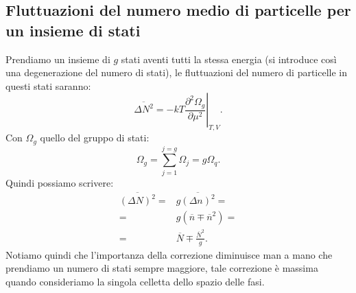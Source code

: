 \subsection{Fluttuazioni del numero medio di particelle per un insieme di stati}
\label{subsec:Fluttuazioni del numero medio di particelle per un insieme di stati}
Prendiamo un insieme di $g$ stati aventi tutti la stessa energia (si introduce così una degenerazione del numero di stati), le fluttuazioni del numero di particelle in questi stati saranno:
\[
	\overline{\Delta N^2} 
	=
	-kT \left.\frac{\partial ^2 \Omega_g}{\partial \mu^2} \right|_{T,V}
.\] 
Con $\Omega_g$ quello del gruppo di stati:
\[
	\Omega _g = \sum_{j=1}^{j=g} \Omega_j = g \Omega _q 
.\] 
Quindi possiamo scrivere:
\[\begin{aligned}
	\overline{\left( \Delta N \right) ^2} 
	=&
	g \overline{\left( \Delta n \right)^2}=\\
	=&
	g \left( \overline{n} \mp \overline{n}^2 \right) =\\
	=&
	\overline{N} \mp \frac{\overline{N}^2}{g} \label{eq:fluttuazioni-g}
.\end{aligned}\]
Notiamo quindi che l'importanza della correzione diminuisce man a mano che prendiamo un numero di stati sempre maggiore, tale correzione è massima quando consideriamo la singola celletta dello spazio delle fasi.
